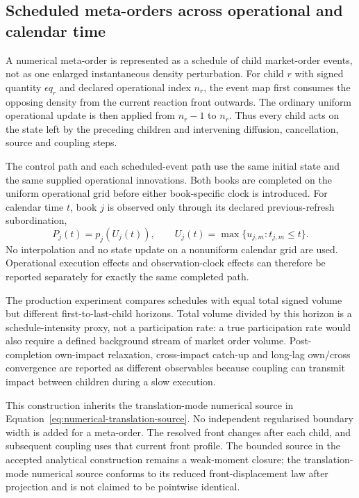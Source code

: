 
\subsection{Scheduled meta-orders across operational and calendar time}
\label{app:scheduled-meta-orders}

A numerical meta-order is represented as a schedule of child market-order
events, not as one enlarged instantaneous density perturbation.  For child
$r$ with signed quantity $\epsilon q_r$ and declared operational index $n_r$,
the event map first consumes the opposing density from the current reaction
front outwards.  The ordinary uniform operational update is then applied from
$n_r-1$ to $n_r$.  Thus every child acts on the state left by the preceding
children and intervening diffusion, cancellation, source and coupling steps.

The control path and each scheduled-event path use the same initial state and
the same supplied operational innovations.  Both books are completed on the
uniform operational grid before either book-specific clock is introduced.
For calendar time $t$, book $j$ is observed only through its declared
previous-refresh subordination,
\begin{equation}
  P_j(t)=p_j\!\left(U_j(t)\right),
  \qquad
  U_j(t)=\max\{u_{j,m}:t_{j,m}\leq t\}.
\end{equation}
No interpolation and no state update on a nonuniform calendar grid are used.
Operational execution effects and observation-clock effects can therefore be
reported separately for exactly the same completed path.

The production experiment compares schedules with equal total signed volume
but different first-to-last-child horizons.  Total volume divided by this
horizon is a schedule-intensity proxy, not a participation rate: a true
participation rate would also require a defined background stream of market
order volume.  Post-completion own-impact relaxation, cross-impact catch-up and
long-lag own/cross convergence are reported as different observables because
coupling can transmit impact between children during a slow execution.

This construction inherits the translation-mode numerical source in
Equation~\eqref{eq:numerical-translation-source}.  No independent regularised
boundary width is added for a meta-order.  The resolved front changes after
each child, and subsequent coupling uses that current front profile.  The
bounded source in the accepted analytical construction remains a weak-moment
closure; the translation-mode numerical source conforms to its reduced
front-displacement law after projection and is not claimed to be pointwise
identical.
